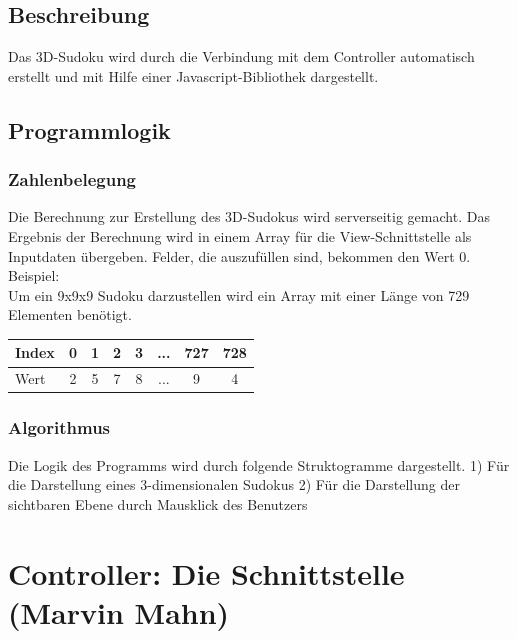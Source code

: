 \documentclass[a4paper,12pt]{scrreprt}
\begin{document}
	\subsection{Beschreibung}
	Das 3D-Sudoku wird durch die Verbindung mit dem Controller automatisch erstellt und mit Hilfe
	einer Javascript-Bibliothek dargestellt.

	\subsection{Programmlogik}
	\subsubsection{Zahlenbelegung}
	Die Berechnung zur Erstellung des 3D-Sudokus wird serverseitig gemacht. Das Ergebnis der
	Berechnung wird in einem Array f\"ur die View-Schnittstelle als Inputdaten \"ubergeben. Felder,
	die auszuf\"ullen sind, bekommen den Wert 0.\medskip \\
	Beispiel:\medskip \\
	Um ein 9x9x9 Sudoku darzustellen wird ein Array mit einer L\"ange von 729 Elementen ben\"otigt.\medskip \\
	\begin{tabular}{l|c|c|c|c|c|c|c}
		\hline
		Index & 0 & 1 & 2 & 3 & ... & 727 & 728 \\
		\hline
		Wert & 2 & 5 & 7 & 8 & ... & 9 & 4 \\
		\hline
	\end{tabular}

	\subsubsection{Algorithmus}
	Die Logik des Programms wird durch folgende Struktogramme dargestellt.
	1) F\"ur die Darstellung eines 3-dimensionalen Sudokus
	2) F\"ur die Darstellung der sichtbaren Ebene durch Mausklick des Benutzers

	\section{Controller: Die Schnittstelle (Marvin Mahn)}
\end{document}
